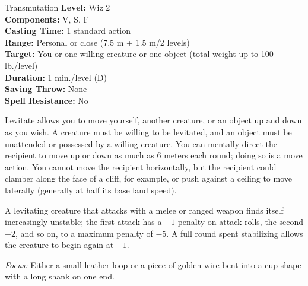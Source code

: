 {Transmutation}
{
	\textbf{Level:}
	Wiz 2\\
	\textbf{Components:}
	V, S, F\\
	\textbf{Casting Time:}
	1 standard action\\
	\textbf{Range:}
	Personal or close (7.5 m + 1.5 m/2 levels)\\
	\textbf{Target:}
	You or one willing creature or one object (total weight up to 100 lb./level)\\
	\textbf{Duration:}
	1 min./level (D)\\
	\textbf{Saving Throw:}
	None\\
	\textbf{Spell Resistance:}
	No\\
}
{
	Levitate allows you to move yourself, another creature, or an object up and down as you wish. A creature must be willing to be levitated, and an object must be unattended or possessed by a willing creature. You can mentally direct the recipient to move up or down as much as 6 meters each round; doing so is a move action. You cannot move the recipient horizontally, but the recipient could clamber along the face of a cliff, for example, or push against a ceiling to move laterally (generally at half its base land speed).

	A levitating creature that attacks with a melee or ranged weapon finds itself increasingly unstable; the first attack has a $-1$ penalty on attack rolls, the second $-2$, and so on, to a maximum penalty of $-5$. A full round spent stabilizing allows the creature to begin again at $-1$.

	\textit{Focus:}
	Either a small leather loop or a piece of golden wire bent into a cup shape with a long shank on one end.

}
